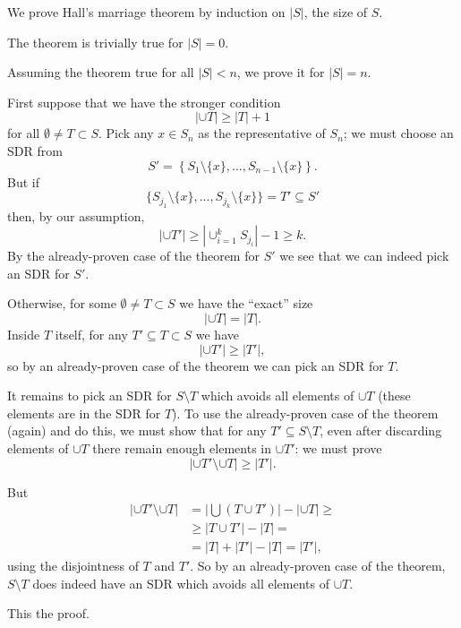 \documentclass[12pt]{article}
\newcommand{\size}[1]{\left|#1\right|}
\begin{document}
We prove Hall's marriage theorem by induction on $\size{S}$, the size of $S$.  

The theorem is trivially true for $|S|=0$.

Assuming the theorem true for all $\size{S}<n$, we prove it for $\size{S}=n$.

\newcommand{\x}[1]{#1\setminus\{x\}}
First suppose that we have the stronger condition 
$$
\size{\cup T} \ge \size{T}+1
$$
for all $\emptyset \ne T \subset S$.  Pick any $x\in S_n$ as the representative of $S_n$; we must choose an SDR from
$$
S' = \left\{\x{S_1},\ldots,\x{S_{n-1}}\right\}.
$$
But if
$$
\{\x{S_{j_1}},...,\x{S_{j_k}}\} = T'\subseteq S'
$$
then, by our assumption,
$$
\size{\cup T'} \ge \size{\cup_{i=1}^{k} S_{j_i}}-1 \ge k.
$$
By the already-proven case of the theorem for $S'$ we see that we can indeed pick an SDR for $S'$.

Otherwise, for some
$\emptyset\ne T \subset S$ we have the ``exact'' size
$$
\size{\cup T}=\size{T}.
$$
Inside $T$ itself, for any $T'\subseteq T\subset S$ we have
$$
\size{\cup T'}\ge\size{T'},
$$
so by an already-proven case of the theorem we can pick an SDR for $T$.

It remains to pick an SDR for $S\setminus T$ which avoids all elements of $\cup T$ (these elements are in the SDR for $T$).
To use the already-proven case of the theorem (again) and do this, we must show that for any $T'\subseteq S\setminus T$, even after discarding elements of $\cup T$ there remain enough elements in $\cup T'$: we must prove
$$
\size{\cup T' \setminus \cup T} \ge \size{T'}.
$$

But
\begin{eqnarray}
\size{\cup T' \setminus \cup T} &= \size{\bigcup(T\cup T')} -
\size{\cup T} \ge\\
&\ge \size{T\cup T'} - \size{T} =\\
&= \size{T} + \size{T'} - \size{T} = \size{T'},
\end{eqnarray}
using the disjointness of $T$ and $T'$.  So by an already-proven case of the theorem, $S\setminus T$ does indeed have an SDR which avoids all elements of $\cup T$.

This  the proof.
\end{document}
